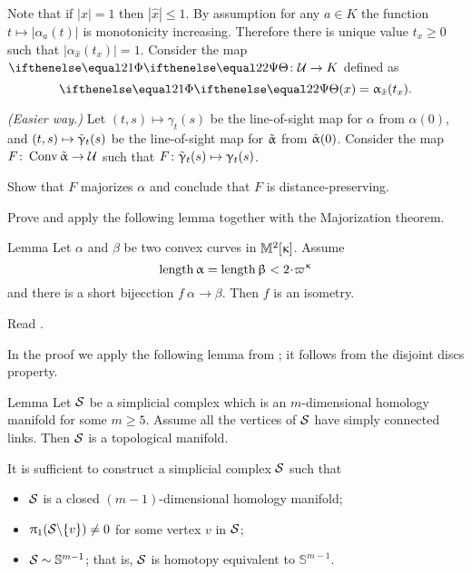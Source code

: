Note that if $|x|=1$ then $|\hat x|\le 1$.
By assumption for any $a\in K$ the function $t\mapsto |\alpha_a(t)|$ is monotonicity increasing.
Therefore there is unique value $t_x\ge 0$ such that
$|\alpha_{\hat x}(t_x)|=1$.
Consider the map $\map[2]\:\spc{U}\to K$
defined as 
\[\map[2](x)=\alpha_{\hat x}(t_x).\]


\textit{(Easier way.)} 
Let 
$(t,s)\mapsto \gamma_t(s)$ be the line-of-sight map 
for $\alpha$ from $\alpha(0)$,
and 
$(t,s)\mapsto \~\gamma_t(s)$ be the line-of-sight map 
for $\~\alpha$ from $\~\alpha(0)$.
Consider the map  $F\:\Conv\~\alpha\to \spc{U}$ such that 
$F\:\~\gamma_t(s)\mapsto \gamma_t(s)$.

Show that $F$ majorizes $\alpha$
and conclude that $F$ is distance-preserving.

Prove and apply the following lemma together with the Majorization theorem.
\begin{thm}{Lemma}\label{lem:short+convex}
Let $\alpha$ and $\beta$ be two convex curves in $\Lob2\kappa$.
Assume 
\[\length \alpha=\length\beta<2\cdot\varpi\kappa\]
and there is a short bijecction $f\:\alpha\to\beta$.
Then $f$ is an isometry.
\end{thm}

Read \cite{lebedeva-petrunin}.

 In the proof we apply the following lemma from \cite{edwards}; 
it follows from the disjoint discs property.


\begin{thm}{Lemma}\label{lem:homomanifold-characterization}
Let $\spc{S}$ be a simplicial complex which 
is an $m$-dimensional homology manifold for some $m\ge 5$.
Assume all the vertices of
$\spc{S}$ have simply connected links.
Then $\spc{S}$ is a topological manifold.
\end{thm}


It is sufficient to construct a simplicial complex $\spc{S}$
such that 
\begin{itemize}
\item $\spc{S}$ is a closed $(m-1)$-dimensional homology manifold;
\item $\pi_1(\spc{S}\backslash\{v\})\ne0$ for some vertex $v$ in $\spc{S}$;
\item $\spc{S}\sim \mathbb{S}^{m-1}$; that is, $\spc{S}$ is homotopy equivalent to $\mathbb{S}^{m-1}$.
\end{itemize}

